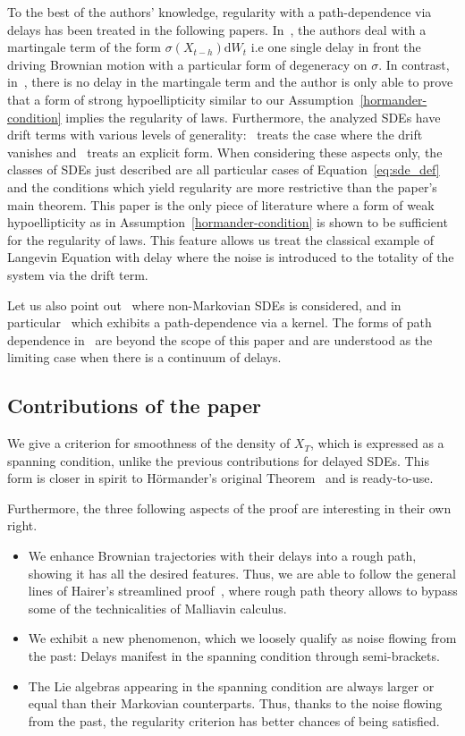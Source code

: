 \documentclass[11pt]{article}
\theoremstyle{definition}
\numberwithin{equation}{section}
\numberwithin{figure}{section}
\numberwithin{table}{section}
\newcommand*{\dd}{\mathrm{d}}
\newcommand*{\dW}{\dd W}
\begin{document}
To the best of the authors' knowledge, regularity with a path-dependence via delays has been treated in the following papers. In~\cite{Bell,BelMo91,BelMo95,stoica1998}, the authors deal with a martingale term of the form $\sigma(X_{t-h}) \dW_t$ i.e one single delay in front the driving Brownian motion with a particular form of degeneracy on $\sigma$. In contrast, in~\cite{takeuchi2007a}, there is no delay in the martingale term and the author is only able to prove that a form of strong hypoellipticity similar to our Assumption~\ref{hormander-condition} implies the regularity of laws. Furthermore, the analyzed SDEs have drift terms with various levels of generality:~\cite{BelMo91} treats the case where the drift vanishes and~\cite{stoica1998} treats an explicit form. When considering these aspects only, the classes of SDEs just described are all particular cases of Equation~\eqref{eq:sde_def} and the conditions which yield regularity are more restrictive than the paper's main theorem. This paper is the only piece of literature where a form of weak hypoellipticity as in Assumption~\ref{hormander-condition} is shown to be sufficient for the regularity of laws. This feature allows us treat the classical example of Langevin Equation with delay where the noise is introduced to the totality of the system via the drift term.

Let us also point out~\cite{ST83} where non-Markovian SDEs is considered, and in particular~\cite[Equation~(9.1) p.~365]{ST83} which exhibits a path-dependence via a kernel. The forms of path dependence in~\cite{ST83,takeuchi2007a} are beyond the scope of this paper and are understood as the limiting case when there is a continuum of delays.


\subsection*{Contributions of the paper}
We give a criterion for smoothness of the density of $X_T$, which is expressed as a spanning condition, unlike the previous contributions for delayed SDEs. This form is closer in spirit to H\"ormander's original Theorem~\cite{hormander1967} and is ready-to-use.

Furthermore, the three following aspects of the proof are interesting in their own right.
\begin{itemize}
\item We enhance Brownian trajectories with their delays into a rough path, showing it has all the desired features. Thus, we are able to follow the general lines of Hairer's streamlined proof~\cite{Hairer11}, where rough path theory allows to bypass some of the technicalities of Malliavin calculus.
\item We exhibit a new phenomenon, which we loosely qualify as noise flowing from the past: Delays manifest in the spanning condition through semi-brackets.
\item The Lie algebras appearing in the spanning condition are always larger or equal than their Markovian counterparts. Thus, thanks to the noise flowing from the past, the regularity criterion has better chances of being satisfied.
\end{itemize}
\end{document}
